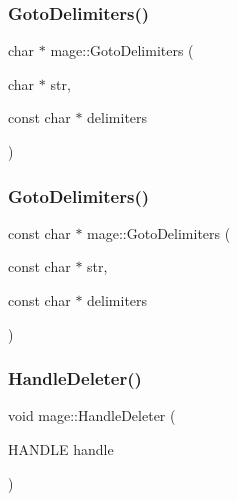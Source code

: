 \hypertarget{namespacemage_a1f8c73ddfbe8a370be1800627136b2ca}{}\label{namespacemage_a1f8c73ddfbe8a370be1800627136b2ca} 
\subsubsection{\texorpdfstring{Goto\+Delimiters()}{GotoDelimiters()}\hspace{0.1cm}{\footnotesize\ttfamily [1/2]}}
{\footnotesize\ttfamily char $\ast$ mage\+::\+Goto\+Delimiters (\begin{DoxyParamCaption}\item[{char $\ast$}]{str,  }\item[{const char $\ast$}]{delimiters }\end{DoxyParamCaption})}

\hypertarget{namespacemage_a3cbc104feb30a9abd8dcec1a77b918b0}{}\label{namespacemage_a3cbc104feb30a9abd8dcec1a77b918b0} 
\subsubsection{\texorpdfstring{Goto\+Delimiters()}{GotoDelimiters()}\hspace{0.1cm}{\footnotesize\ttfamily [2/2]}}
{\footnotesize\ttfamily const char $\ast$ mage\+::\+Goto\+Delimiters (\begin{DoxyParamCaption}\item[{const char $\ast$}]{str,  }\item[{const char $\ast$}]{delimiters }\end{DoxyParamCaption})}

\hypertarget{namespacemage_ab8f0b2f46629338cab3de903274f1747}{}\label{namespacemage_ab8f0b2f46629338cab3de903274f1747} 
\subsubsection{\texorpdfstring{Handle\+Deleter()}{HandleDeleter()}}
{\footnotesize\ttfamily void mage\+::\+Handle\+Deleter (\begin{DoxyParamCaption}\item[{H\+A\+N\+D\+LE}]{handle }\end{DoxyParamCaption})}

